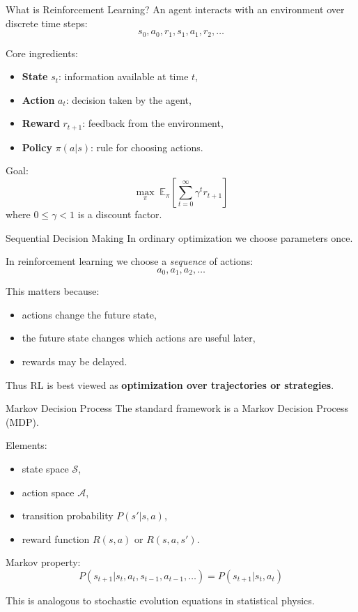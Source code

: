 \documentclass{beamer}
\begin{document}
\begin{frame}{What is Reinforcement Learning?}
  An agent interacts with an environment over discrete time steps:
  \[
  s_0,a_0,r_1,s_1,a_1,r_2,\dots
  \]

  Core ingredients:
  \begin{itemize}
  \item \textbf{State} $s_t$: information available at time $t$,
  \item \textbf{Action} $a_t$: decision taken by the agent,
  \item \textbf{Reward} $r_{t+1}$: feedback from the environment,
  \item \textbf{Policy} $\pi(a|s)$: rule for choosing actions.
  \end{itemize}

  Goal:
  \[
  \max_\pi \; \mathbb{E}_\pi\!\left[\sum_{t=0}^{\infty}\gamma^t r_{t+1}\right]
  \]
  where $0\le \gamma <1$ is a discount factor.
\end{frame}

\begin{frame}{Sequential Decision Making}
  In ordinary optimization we choose parameters once.

  In reinforcement learning we choose a \emph{sequence} of actions:
  \[
  a_0,a_1,a_2,\dots
  \]

  This matters because:
  \begin{itemize}
  \item actions change the future state,
  \item the future state changes which actions are useful later,
  \item rewards may be delayed.
  \end{itemize}

  Thus RL is best viewed as \textbf{optimization over trajectories or strategies}.
\end{frame}

\begin{frame}{Markov Decision Process}
  The standard framework is a Markov Decision Process (MDP).

  Elements:
  \begin{itemize}
  \item state space $\mathcal S$,
  \item action space $\mathcal A$,
  \item transition probability $P(s'|s,a)$,
  \item reward function $R(s,a)$ or $R(s,a,s')$.
  \end{itemize}

  Markov property:
  \[
  P(s_{t+1}|s_t,a_t,s_{t-1},a_{t-1},\dots)=P(s_{t+1}|s_t,a_t)
  \]

  This is analogous to stochastic evolution equations in statistical physics.
\end{frame}
\end{document}
